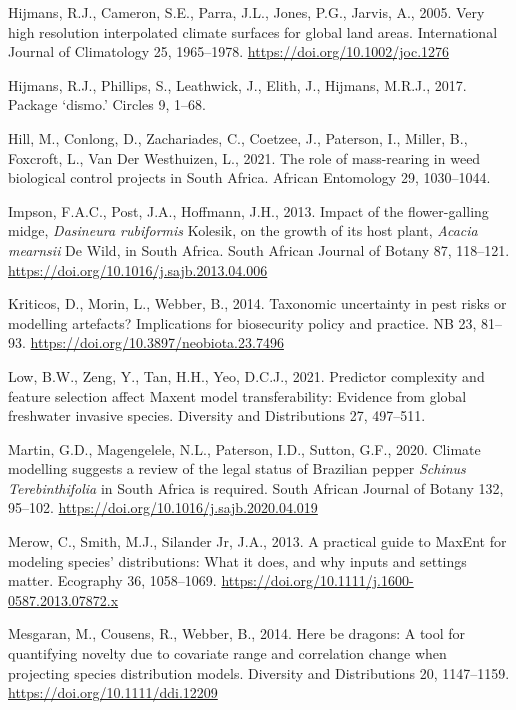 \documentclass[12pt,]{article}
\begin{document}
\begin{CSLReferences}{1}{0}
\leavevmode\hypertarget{ref-Hijmans2005}{}%
Hijmans, R.J., Cameron, S.E., Parra, J.L., Jones, P.G., Jarvis, A.,
2005. Very high resolution interpolated climate surfaces for global land
areas. International Journal of Climatology 25, 1965--1978.
\url{https://doi.org/10.1002/joc.1276}

\leavevmode\hypertarget{ref-hijmans2017package}{}%
Hijmans, R.J., Phillips, S., Leathwick, J., Elith, J., Hijmans, M.R.J.,
2017. Package {`dismo.'} Circles 9, 1--68.

\leavevmode\hypertarget{ref-Hill2021}{}%
Hill, M., Conlong, D., Zachariades, C., Coetzee, J., Paterson, I.,
Miller, B., Foxcroft, L., Van Der Westhuizen, L., 2021. The role of
mass-rearing in weed biological control projects in {South Africa}.
African Entomology 29, 1030--1044.

\leavevmode\hypertarget{ref-Impson2013}{}%
Impson, F.A.C., Post, J.A., Hoffmann, J.H., 2013. Impact of the
flower-galling midge, {\emph{Dasineura rubiformis}} {Kolesik}, on the
growth of its host plant, {\emph{Acacia mearnsii}} {De Wild}, in {South
Africa}. South African Journal of Botany 87, 118--121.
\url{https://doi.org/10.1016/j.sajb.2013.04.006}

\leavevmode\hypertarget{ref-Kriticos2014}{}%
Kriticos, D., Morin, L., Webber, B., 2014. Taxonomic uncertainty in pest
risks or modelling artefacts? {Implications} for biosecurity policy and
practice. NB 23, 81--93. \url{https://doi.org/10.3897/neobiota.23.7496}

\leavevmode\hypertarget{ref-Low2021}{}%
Low, B.W., Zeng, Y., Tan, H.H., Yeo, D.C.J., 2021. Predictor complexity
and feature selection affect {Maxent} model transferability: {Evidence}
from global freshwater invasive species. Diversity and Distributions 27,
497--511.

\leavevmode\hypertarget{ref-Martin2020}{}%
Martin, G.D., Magengelele, N.L., Paterson, I.D., Sutton, G.F., 2020.
Climate modelling suggests a review of the legal status of {Brazilian}
pepper {\emph{Schinus}}{ \emph{Terebinthifolia}} in {South Africa} is
required. South African Journal of Botany 132, 95--102.
\url{https://doi.org/10.1016/j.sajb.2020.04.019}

\leavevmode\hypertarget{ref-Merow2013}{}%
Merow, C., Smith, M.J., Silander Jr, J.A., 2013. A practical guide to
{MaxEnt} for modeling species' distributions: What it does, and why
inputs and settings matter. Ecography 36, 1058--1069.
\url{https://doi.org/10.1111/j.1600-0587.2013.07872.x}

\leavevmode\hypertarget{ref-Mesgaran2014}{}%
Mesgaran, M., Cousens, R., Webber, B., 2014. Here be dragons: {A} tool
for quantifying novelty due to covariate range and correlation change
when projecting species distribution models. Diversity and Distributions
20, 1147--1159. \url{https://doi.org/10.1111/ddi.12209}


\end{CSLReferences}
\end{document}
